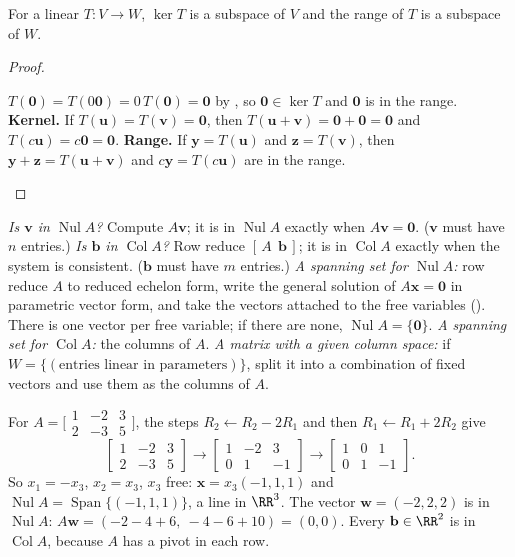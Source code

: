 \documentclass[10pt]{scrartcl}
\newcommand{\vv}[1]{\mathbf{#1}}
\DeclareMathOperator{\spn}{Span}\DeclareMathOperator{\Nul}{Nul}\DeclareMathOperator{\Col}{Col}\DeclareMathOperator{\Row}{Row}\DeclareMathOperator{\adj}{adj}
\begin{document}
\begin{proposition*}
  For a linear $T\colon V\to W$, $\ker T$ is a subspace of $V$ and the range of $T$ is a subspace of $W$.
\end{proposition*}
\begin{proof}
  \begin{steps}
    \ii $T(\vv 0)=T(0\vv 0)=0\,T(\vv 0)=\vv 0$ by , so $\vv 0\in\ker T$ and $\vv 0$ is in the range.
    \ii \textbf{Kernel.} If $T(\vv u)=T(\vv v)=\vv 0$, then $T(\vv u+\vv v)=\vv 0+\vv 0=\vv 0$ and $T(c\vv u)=c\vv 0=\vv 0$.
    \ii \textbf{Range.} If $\vv y=T(\vv u)$ and $\vv z=T(\vv v)$, then $\vv y+\vv z=T(\vv u+\vv v)$ and $c\vv y=T(c\vv u)$ are in the range.
  \end{steps}
\end{proof}

\method{How to work with $\Nul A$ and $\Col A$.}
\begin{steps}
  \ii \emph{Is $\vv v$ in $\Nul A$?} Compute $A\vv v$; it is in $\Nul A$ exactly when $A\vv v=\vv 0$. ($\vv v$ must have $n$ entries.)
  \ii \emph{Is $\vv b$ in $\Col A$?} Row reduce $[\,A\ \ \vv b\,]$; it is in $\Col A$ exactly when the system is consistent. ($\vv b$ must have $m$ entries.)
  \ii \emph{A spanning set for $\Nul A$:} row reduce $A$ to reduced echelon form, write the general solution of $A\vv x=\vv 0$ in parametric vector form, and take the vectors attached to the free variables (). There is one vector per free variable; if there are none, $\Nul A=\{\vv 0\}$.
  \ii \emph{A spanning set for $\Col A$:} the columns of $A$.
  \ii \emph{A matrix with a given column space:} if $W=\{(\text{entries linear in parameters})\}$, split it into a combination of fixed vectors and use them as the columns of $A$.
\end{steps}

\begin{example*}
For $A=\bigl[\begin{smallmatrix}1&-2&3\\2&-3&5\end{smallmatrix}\bigr]$, the steps $R_2\leftarrow R_2-2R_1$ and then $R_1\leftarrow R_1+2R_2$ give
\[
  \begin{bmatrix}1&-2&3\\2&-3&5\end{bmatrix}\longrightarrow\begin{bmatrix}1&-2&3\\0&1&-1\end{bmatrix}\longrightarrow\begin{bmatrix}1&0&1\\0&1&-1\end{bmatrix}.
\]
So $x_1=-x_3$, $x_2=x_3$, $x_3$ free: $\vv x=x_3(-1,1,1)$ and $\Nul A=\spn\{(-1,1,1)\}$, a line in $\RR^3$. The vector $\vv w=(-2,2,2)$ is in $\Nul A$: $A\vv w=(-2-4+6,\ -4-6+10)=(0,0)$. Every $\vv b\in\RR^2$ is in $\Col A$, because $A$ has a pivot in each row.
\end{example*}
\end{document}
